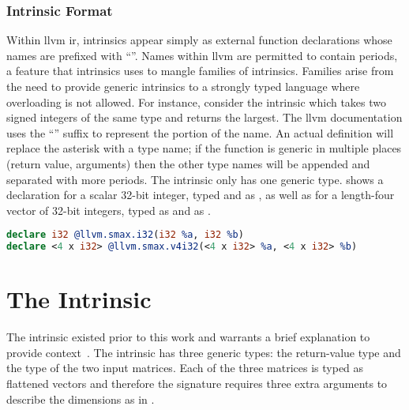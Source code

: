 \documentclass[\main/thesis.tex]{subfiles}
\begin{document}
\subsubsection{Intrinsic Format}
Within \gls{llvm} \gls{ir}, \glspl{intrinsic} appear simply as external function declarations whose names are prefixed with ``''.
Names within \gls{llvm} are permitted to contain periods, a feature that \glspl{intrinsic} uses to \gls{mangle}  families of \glspl{intrinsic}.
Families arise from the need to provide generic \glspl{intrinsic} to a strongly typed language where overloading is not allowed.
For instance, consider the  \gls{intrinsic} which takes two signed integers of the same type and returns the largest.
The \gls{llvm} documentation uses the ``'' suffix to represent the  portion of the name.
An actual definition will replace the asterisk with a type name; if the function is generic in multiple places (return value, arguments) then the other type names will be appended and separated with more periods.
The  \gls{intrinsic} only has one generic type.
 shows a declaration for a scalar 32-bit integer, typed and  as , as well as for a length-four vector of 32-bit integers, typed as  and  as .

\begin{lstlisting}[caption={[Example Inrinsic Declarations]A set of basic intrinsic declarations~\autocite{llvmLangref}.},
      label=lst:intrinsics,numbers=none,language=llvm,float,columns=flexible]
declare i32 @llvm.smax.i32(i32 %a, i32 %b)
declare <4 x i32> @llvm.smax.v4i32(<4 x i32> %a, <4 x i32> %b)
\end{lstlisting}

\section{The \texorpdfstring{}{llvm.matrix.multiply.*} Intrinsic}
\label{sec:matMulInt}
The  \gls{intrinsic} existed prior to this work and warrants a brief explanation to provide context~\autocite{llvmLangref}.
The \gls{intrinsic} has three generic types: the return-value type and the type of the two input matrices.
Each of the three matrices is typed as flattened vectors and therefore the signature requires three extra arguments to describe the dimensions as in .
\end{document}
